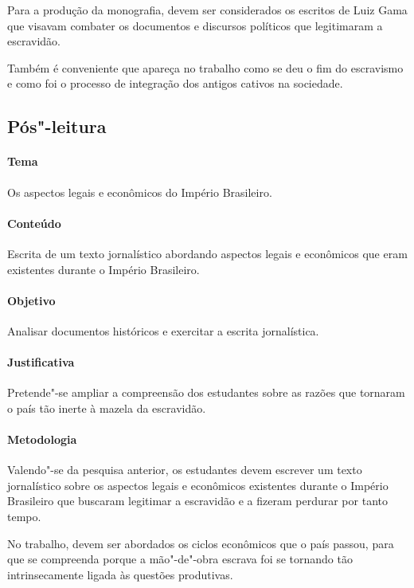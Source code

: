 \documentclass[12pt]{extarticle}
\begin{document}
Para a produção da monografia, devem ser considerados os escritos de Luiz Gama
que visavam combater os documentos e discursos políticos que legitimaram a escravidão.

Também é conveniente que apareça no trabalho como se deu o fim do
escravismo e como foi o processo de integração dos antigos cativos na
sociedade.



\subsection{Pós"-leitura}


\paragraph{Tema} Os aspectos legais e econômicos do Império Brasileiro.

\paragraph{Conteúdo} Escrita de um texto jornalístico abordando aspectos legais e
econômicos que eram existentes durante o Império Brasileiro.

\paragraph{Objetivo} Analisar documentos históricos e exercitar a escrita jornalística.

\paragraph{Justificativa} Pretende"-se ampliar a compreensão dos estudantes sobre as razões que
tornaram o país tão inerte à mazela da escravidão.

\paragraph{Metodologia} Valendo"-se da pesquisa anterior, os estudantes
devem escrever um texto jornalístico sobre os aspectos legais e econômicos
existentes durante o Império Brasileiro que buscaram legitimar a escravidão
e a fizeram perdurar por tanto tempo.

No trabalho, devem ser abordados os ciclos econômicos que o país passou,
para que se compreenda porque a mão"-de"-obra escrava foi se tornando
tão intrinsecamente ligada às questões produtivas. 
\end{document}
